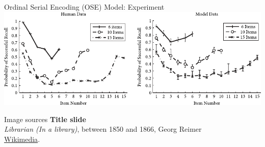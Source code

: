 \documentclass[handout,aspectratio=169]{beamer}
\begin{document}
	\begin{frame}{Ordinal Serial Encoding (OSE) Model: Experiment}
		\centering
		\includegraphics[width=\textwidth]{media/htbab_ose_experiment.pdf}
	\end{frame}

	\backupbegin

	\begin{frame}[noframenumbering]{Image sources}
		\small
		\textbf{Title slide}\\\emph{Librarian (In a library)}, between 1850 and 1866,  Georg Reimer\\ \href{https://commons.wikimedia.org/wiki/File:Reimer_Librarian.jpg}{Wikimedia}.
	\end{frame}

	\backupend
	
\end{document}
